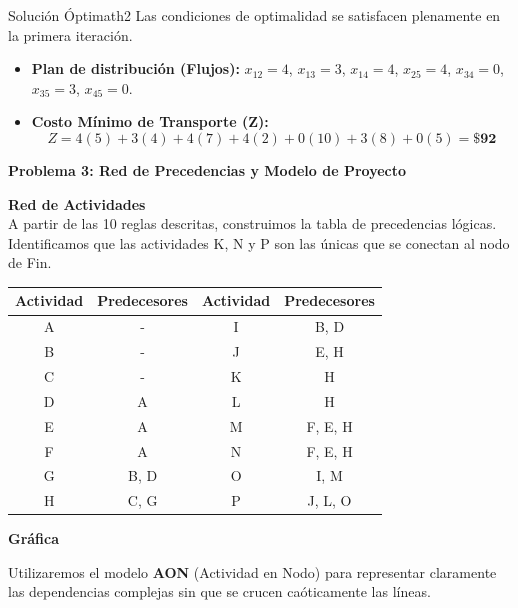\documentclass[10pt,a4paper]{article}
\begin{document}
\begin{mytheo}{Solución Óptima}{th2}
Las condiciones de optimalidad se satisfacen plenamente en la primera iteración. 
\begin{itemize}
    \item \textbf{Plan de distribución (Flujos):} $x_{12}=4$, $x_{13}=3$, $x_{14}=4$, $x_{25}=4$, $x_{34}=0$, $x_{35}=3$, $x_{45}=0$.
    \item \textbf{Costo Mínimo de Transporte (Z):} 
    \[ Z = 4(5) + 3(4) + 4(7) + 4(2) + 0(10) + 3(8) + 0(5) = \mathbf{\$92} \]
\end{itemize}
\end{mytheo}

\newpage


\textbf{Problema 3: Red de Precedencias y Modelo de Proyecto}


\textbf{Red de Actividades}\\
A partir de las 10 reglas descritas, construimos la tabla de precedencias lógicas. Identificamos que las actividades K, N y P son las únicas que se conectan al nodo de Fin.

\begin{table}[H]
\centering
\begin{tabular}{c c | c c}
\toprule
\textbf{Actividad} & \textbf{Predecesores} & \textbf{Actividad} & \textbf{Predecesores} \\
\midrule
A & - & I & B, D \\
B & - & J & E, H \\
C & - & K & H \\
D & A & L & H \\
E & A & M & F, E, H \\
F & A & N & F, E, H \\
G & B, D & O & I, M \\
H & C, G & P & J, L, O \\
\bottomrule
\end{tabular}
\end{table}

\textbf{Gráfica}

Utilizaremos el modelo \textbf{AON} (Actividad en Nodo) para representar claramente las dependencias complejas sin que se crucen caóticamente las líneas.
\end{document}

